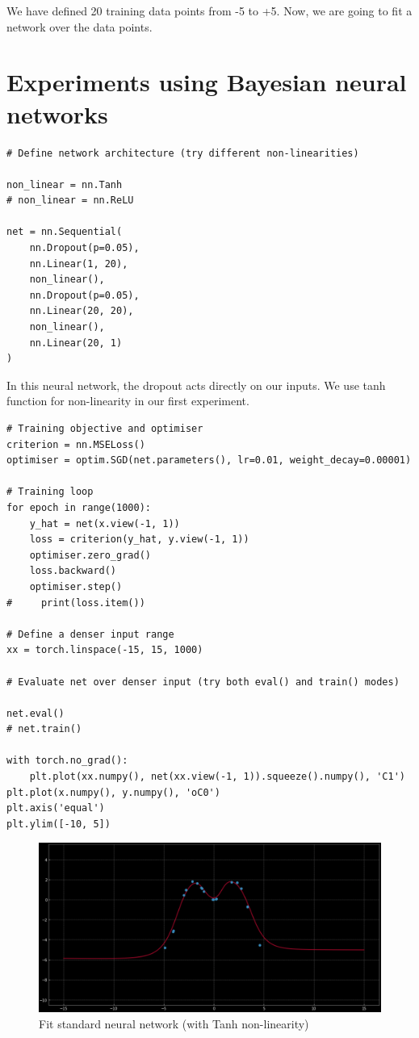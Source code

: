 We have defined 20 training data points from -5 to +5. Now, we are going to fit a network over the data points.

\section{Experiments using Bayesian neural networks}
\begin{verbatim}
# Define network architecture (try different non-linearities)

non_linear = nn.Tanh
# non_linear = nn.ReLU

net = nn.Sequential(
    nn.Dropout(p=0.05),
    nn.Linear(1, 20),
    non_linear(),
    nn.Dropout(p=0.05),
    nn.Linear(20, 20),
    non_linear(),
    nn.Linear(20, 1)
)
\end{verbatim}
In this neural network, the dropout acts directly on our inputs. We use tanh function for non-linearity in our first experiment.  

\begin{verbatim}
# Training objective and optimiser
criterion = nn.MSELoss()
optimiser = optim.SGD(net.parameters(), lr=0.01, weight_decay=0.00001)

# Training loop
for epoch in range(1000):
    y_hat = net(x.view(-1, 1))
    loss = criterion(y_hat, y.view(-1, 1))
    optimiser.zero_grad()
    loss.backward()
    optimiser.step()
#     print(loss.item())

# Define a denser input range
xx = torch.linspace(-15, 15, 1000)

# Evaluate net over denser input (try both eval() and train() modes)

net.eval()
# net.train()

with torch.no_grad():
    plt.plot(xx.numpy(), net(xx.view(-1, 1)).squeeze().numpy(), 'C1')
plt.plot(x.numpy(), y.numpy(), 'oC0')
plt.axis('equal')
plt.ylim([-10, 5])
\end{verbatim}

\begin{figure}[H]
    \centering
    \includegraphics[width=\textwidth]{figs/exp_2.png}
    \caption{Fit standard neural network (with Tanh non-linearity)}
    \label{fig:fit_standardNN}
\end{figure}

